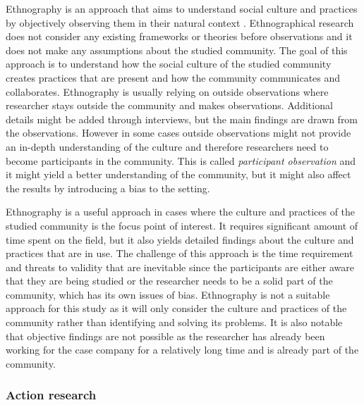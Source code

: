 Ethnography is an approach that aims to understand social culture and practices by objectively observing them in their natural context \citep{Robinson2007}.
Ethnographical research does not consider any existing frameworks or theories before observations and it does not make any assumptions about the studied community.
The goal of this approach is to understand how the social culture of the studied community creates practices that are present and how the community
communicates and collaborates. Ethnography is usually relying on outside observations where researcher stays outside the community and makes observations. Additional
details might be added through interviews, but the main findings are drawn from the observations. However in some cases outside observations might not provide an in-depth
understanding of the culture and therefore researchers need to become participants in the community. This is called \emph{participant observation} and it might
yield a better understanding of the community, but it might also affect the results by introducing a bias to the setting. \citep{Easterbrook2008}

Ethnography is a useful
approach in cases where the culture and practices of the studied community is the focus point of interest. It requires significant amount of time spent on the field,
but it also yields detailed findings about the culture and practices that are in use. The challenge of this approach is the time requirement and threats to validity that
are inevitable since the participants are either aware that they are being studied or the researcher needs to be a solid part of the community, which has its own issues of bias.
Ethnography is not a suitable approach for this study as it will only consider the culture and practices of the community rather than identifying and solving its problems.
It is also notable that objective findings are not possible as the researcher has already been working for the case company for a relatively long time and is already part of the community.

\subsubsection*{Action research}

